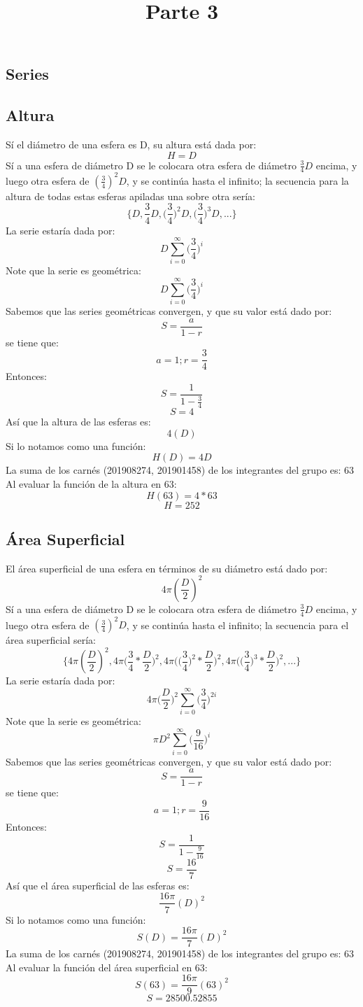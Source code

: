 \documentclass{article}
\title{Parte 3}
\begin{document}
\maketitle
\begin{center}
\section{Series}
\end{center}
\newpage

\subsection{Altura}

Sí el diámetro de una esfera es D, su altura está dada por:
\[
	H = D
\]
Sí a una esfera de diámetro D se le colocara otra esfera de diámetro $ \frac{3}{4}D $ encima, y luego otra esfera de $ (\frac{3}{4})^2D $, y se continúa hasta el infinito; la secuencia para la altura de todas estas esferas apiladas una sobre otra sería:
\[
	\Bigg\{D, \frac{3}{4}D, \Big(\frac{3}{4}\Big)^2D, \Big(\frac{3}{4}\Big)^3D, ...\Bigg\}
\]
La serie estaría dada por:
\[
	D\sum_{i=0}^{\infty}{\Big(\frac{3}{4}\Big)^{i}}
\]
Note que la serie es geométrica:
\[
	D\sum_{i=0}^{\infty}{\Big(\frac{3}{4}\Big)^{i}}
\]
Sabemos que las series geométricas convergen, y que su valor está dado por: $$ S = \frac{a}{1 - r} $$ se tiene que: $$ a = 1 ; r = \frac{3}{4}$$ Entonces: $$ S = \frac{1}{1-\frac{3}{4}} $$ $$ S = 4$$
Así que la altura de las esferas es: 
\[
	4(D)
\]
Si lo notamos como una función:
\[
	H(D) = 4D
\]
La suma de los carnés (201908274, 201901458) de los integrantes del grupo es: 63
Al evaluar la función de la altura en 63:
\[
	H(63) = 4*63
\]
\[
	H = 252
\]

\newpage
\subsection{Área Superficial}
El área superficial de una esfera en términos de su diámetro está dado por:
\[
	4\pi(\frac{D}{2})^2
\]
Sí a una esfera de diámetro D se le colocara otra esfera de diámetro $ \frac{3}{4}D $ encima, y luego otra esfera de $ (\frac{3}{4})^2D $, y se continúa hasta el infinito; la secuencia para el área superficial sería:
\[
	\Bigg\{4\pi(\frac{D}{2})^2, 4\pi\Big(\frac{3}{4}*\frac{D}{2}\Big)^2, 4\pi\Big(\Big(\frac{3}{4}\Big)^2*\frac{D}{2}\Big)^2, 4\pi\Big(\Big(\frac{3}{4}\Big)^3*\frac{D}{2}\Big)^2, ... \Bigg\}
\]
La serie estaría dada por:
\[
	4\pi\Big(\frac{D}{2}\Big)^2\sum_{i=0}^{\infty}{\Big(\frac{3}{4}\Big)^{2i}}
\]
Note que la serie es geométrica:
\[
	\pi D^2\sum_{i=0}^{\infty}{\Big(\frac{9}{16}\Big)^{i}}
\]
Sabemos que las series geométricas convergen, y que su valor está dado por: $$ S = \frac{a}{1 - r} $$ se tiene que: $$ a = 1 ; r = \frac{9}{16}$$ Entonces: $$ S = \frac{1}{1-\frac{9}{16}} $$ $$ S = \frac{16}{7}$$
Así que el área superficial de las esferas es: 
\[
	\frac{16\pi}{7}(D)^2
\]
Si lo notamos como una función:
\[
	S(D) = \frac{16\pi}{7}(D)^2
\]
La suma de los carnés (201908274, 201901458) de los integrantes del grupo es: 63
Al evaluar la función del área superficial en 63:
\[
	S(63) = \frac{16\pi}{9}(63)^2
\]
\[
	S = 28500.52855
\]
\end{document}
